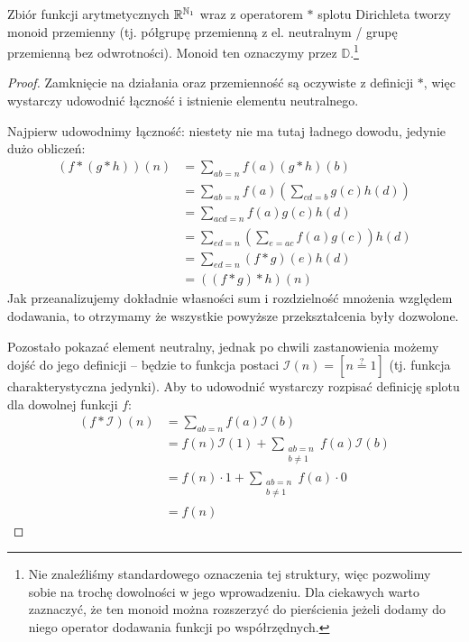 \begin{theorem}
	\label{nt:dirichletmonoid}
	Zbiór funkcji arytmetycznych $\mathbb{R}^{\mathbb{N}_1}$ wraz z operatorem $*$ splotu Dirichleta tworzy
	monoid przemienny (tj. półgrupę przemienną z el. neutralnym / grupę przemienną bez odwrotności).
	Monoid ten oznaczymy przez $\mathbb D$.\footnote{Nie znaleźliśmy standardowego oznaczenia tej struktury, więc pozwolimy sobie na trochę
		dowolności w jego wprowadzeniu. Dla ciekawych warto zaznaczyć, że ten monoid można rozszerzyć do pierścienia jeżeli dodamy do niego
		operator dodawania funkcji po współrzędnych.}
\end{theorem}
\begin{proof}
	Zamknięcie na działania oraz przemienność są oczywiste z definicji $*$, więc wystarczy
	udowodnić łączność i istnienie elementu neutralnego.

	Najpierw udowodnimy łączność: niestety nie ma tutaj ładnego dowodu,
	jedynie dużo obliczeń:
	\begin{align*}
		(f * (g * h))(n) & = \sum_{ab = n} f(a) (g*h)(b)                             \\
		                 & = \sum_{ab = n} f(a) \left(\sum_{cd = b} g(c) h(d)\right) \\
		                 & = \sum_{acd = n} f(a) g(c) h(d)                           \\
		                 & = \sum_{ed = n} \left(\sum_{e = ac} f(a) g(c)\right) h(d) \\
		                 & = \sum_{ed = n} (f * g)(e) h(d)                           \\
		                 & = ((f * g) * h)(n)
	\end{align*}
	Jak przeanalizujemy dokładnie własności sum i rozdzielność mnożenia względem
	dodawania, to otrzymamy że wszystkie powyższe przekształcenia były dozwolone.

	Pozostało pokazać element neutralny, jednak po chwili zastanowienia możemy dojść
	do jego definicji -- będzie to funkcja postaci $\mathcal I(n) = [n \stackrel{?}{=} 1]$ (tj. funkcja charakterystyczna jedynki).
	Aby to udowodnić wystarczy rozpisać definicję splotu dla dowolnej funkcji $f$:
	\begin{align*}
		(f * \mathcal I)(n) & = \sum_{ab = n} f(a) \mathcal I(b)            \\
		                    & = f(n) \mathcal I(1) + \sum_{\substack{ab = n \\ b \neq 1}} f(a) \mathcal I(b) \\
		                    & = f(n) \cdot 1 + \sum_{\substack{ab = n       \\ b \neq 1}} f(a) \cdot 0             \\
		                    & = f(n)
	\end{align*}
\end{proof}

